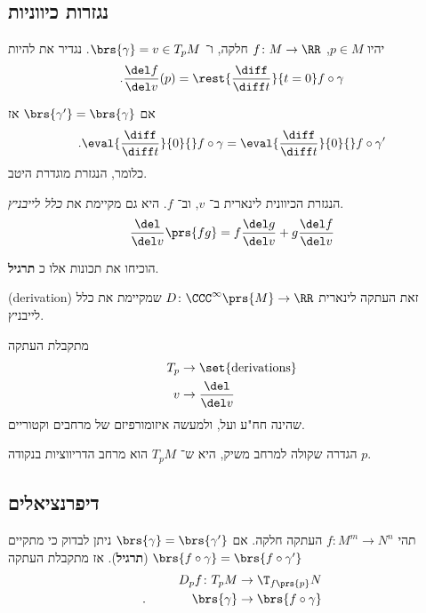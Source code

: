 \documentclass[a4paper,10pt,twoside,openany]{book}
\begin{document}
\subsection{נגזרות כיווניות}
יהיו
$p \in M$,
$f \colon M \to \RR$
חלקה,
ו־%
$\brs{\gamma} = v \in T_p M$.
נגדיר את
להיות
\begin{align*}
\text{.}\frac{\del f}{\del v}(p) = \rest{\frac{\diff}{\diff t}}{t=0} f \circ \gamma
\end{align*}

\begin{exercise}
אם
$\brs{\gamma'} = \brs{\gamma}$
אז
\begin{align*}
\text{.} \eval{\frac{\diff}{\diff t}}{0}{} f\circ \gamma = \eval{\frac{\diff}{\diff t}}{0}{} f\circ \gamma'
\end{align*}
כלומר, הנגזרת מוגדרת היטב.
\end{exercise}

הנגזרת הכיוונית לינארית ב־%
$v$,
וב־%
$f$.
היא גם מקיימת את
\emph{כלל לייבניץ}.
\begin{align*}
\frac{\del}{\del v} \prs{fg} = f\frac{\del g}{\del v} + g\frac{\del f}{\del v}
\end{align*}

הוכיחו את תכונות אלו כ%
\textbf{תרגיל}.

\begin{definition}
\textenglish{(derivation)}
זאת העתקה לינארית
$D \colon \CCC^{\infty}\prs{M} \to \RR$
שמקיימת את כלל לייבניץ.
\end{definition}
\begin{remark}
מתקבלת העתקה
\begin{align*}
T_p &\to \set{\text{derivations}} \\
v &\to \frac{\del}{\del v}
\end{align*}
שהינה חח"ע ועל, ולמעשה איזומורפיזם של מרחבים וקטוריים.
\end{remark}
\begin{remark}
הגדרה שקולה למרחב משיק, היא ש־%
$T_p M$
הוא מרחב הדריווציות בנקודה
$p$.
\end{remark}
\subsection{דיפרנציאלים}
תהי
$f \colon M^m \to N^n$
העתקה חלקה. אם
$\brs{\gamma} = \brs{\gamma'}$
ניתן לבדוק כי מתקיים
$\brs{f\circ \gamma} = \brs{f\circ \gamma'}$
(\textbf{תרגיל}).
אז מתקבלת העתקה
\begin{align*}
D_p f \colon T_p M &\to \T_{f\prs{p}}N \\
\text{.} \phantom{D_p f XX} \brs{\gamma} &\to \brs{f\circ \gamma}
\end{align*}
\end{document}
